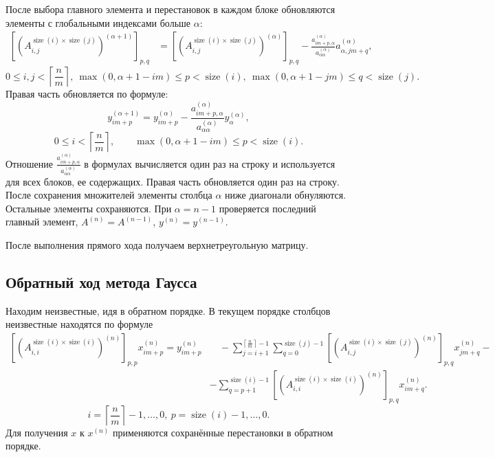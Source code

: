 \documentclass[a4paper,12pt]{article}
\begin{document}
После выбора главного элемента и перестановок в каждом блоке обновляются элементы с глобальными индексами больше $\alpha$:
\begin{align*}
    \left[ \left(A_{i, j}^{\operatorname{size}(i) \times \operatorname{size}(j)} \right)^{(\alpha + 1)} \right]_{p, q}
    & = \left[ \left(A_{i, j}^{\operatorname{size}(i) \times \operatorname{size}(j)} \right)^{(\alpha)} \right]_{p, q} - \frac{a_{i m + p, \alpha}^{(\alpha)}}{a_{\alpha \alpha}^{(\alpha)}} a_{\alpha, j m + q}^{(\alpha)},
\end{align*}
\[
    0 \leq i, j < \left\lceil \frac{n}{m} \right\rceil, \
    \max(0, \alpha + 1 - i m) \leq p < \operatorname{size}(i), \
    \max(0, \alpha + 1 - j m) \leq q < \operatorname{size}(j).
\]
Правая часть обновляется по формуле:
\[
    y_{i m + p}^{(\alpha + 1)} = y_{i m + p}^{(\alpha)} -
    \frac{a_{i m + p, \alpha}^{(\alpha)}}{a_{\alpha \alpha}^{(\alpha)}}
    y_\alpha^{(\alpha)},
\]
\[
    0 \leq i < \left\lceil \frac{n}{m} \right\rceil, \qquad
    \max(0, \alpha + 1 - i m) \leq p < \operatorname{size}(i).
\]
Отношение $\frac{a_{i m + p, \alpha}^{(\alpha)}}{a_{\alpha \alpha}^{(\alpha)}}$ в формулах вычисляется один раз на строку и используется для всех блоков, ее содержащих. Правая часть обновляется один раз на строку. После сохранения множителей элементы столбца $\alpha$ ниже диагонали обнуляются. Остальные элементы сохраняются. При $\alpha = n - 1$ проверяется последний главный элемент, $A^{(n)} = A^{(n - 1)}$, $y^{(n)} = y^{(n - 1)}$.

После выполнения прямого хода получаем верхнетреугольную матрицу.

\subsection{Обратный ход метода Гаусса}
Находим неизвестные, идя в обратном порядке. В текущем порядке столбцов неизвестные находятся по формуле
\begin{align*}
    \left[ \left(A_{i, i}^{\operatorname{size}(i) \times \operatorname{size}(i)} \right)^{(n)} \right]_{p, p} x_{i m + p}^{(n)} = y_{i m + p}^{(n)} & \quad - \sum_{j = i + 1}^{\left\lceil \frac{n}{m} \right\rceil - 1} \sum_{q = 0}^{\operatorname{size}(j) - 1} \left[ \left(A_{i, j}^{\operatorname{size}(i) \times \operatorname{size}(j)} \right)^{(n)} \right]_{p, q} x_{j m + q}^{(n)} -  \\
    & - \sum_{q = p + 1}^{\operatorname{size}(i) - 1}
    \left[ \left(A_{i, i}^{\operatorname{size}(i) \times \operatorname{size}(i)}
    \right)^{(n)} \right]_{p, q} x_{i m + q}^{(n)}.
\end{align*}
\[
    i = \left\lceil \frac{n}{m} \right\rceil - 1, \ldots, 0, \
    p = \operatorname{size}(i) - 1, \ldots, 0.
\]
Для получения $x$ к $x^{(n)}$ применяются сохранённые перестановки в обратном порядке.
\end{document}
